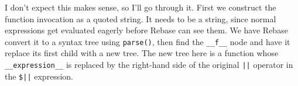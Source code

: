 \documentclass{report}
\begin{document}
      I don't expect this makes sense, so I'll go through it. First we construct the function invocation as a quoted string. It needs to be a string, since normal expressions get evaluated
      eagerly before Rebase can see them. We have Rebase convert it to a syntax tree using \verb|parse()|, then find the \verb|__f__| node and have it replace its first child with a new tree.
      The new tree here is a function whose \verb|__expression__| is replaced by the right-hand side of the original \verb+||+ operator in the \verb+$||+ expression.
\end{document}
